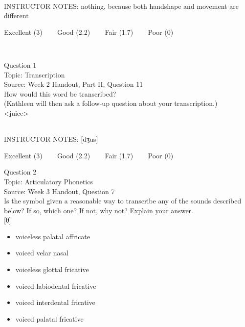 \documentclass[12pt]{article}
\begin{document}
~\\
INSTRUCTOR NOTES: nothing, because both handshape and movement are different


\vfill
Excellent (3) ~~~ Good (2.2) ~~~ Fair (1.7) ~~~ Poor (0)
\newpage

\begin{center}
\textbf{{\color{red}{\HUGE END OF EXAM}}}\\

\end{center}
\newpage

\begin{center}
\textbf{{\color{blue}{\HUGE START OF EXAM\\}}}

\textbf{{\color{blue}{\HUGE Student ID: 67535\\}}}

\textbf{{\color{blue}{\HUGE \\}}}

\end{center}
\newpage

{\large Question 1}\\

Topic: Transcription\\
Source: Week 2 Handout, Part II, Question 11\\

How would this word be transcribed?\\ (Kathleen will then ask a follow-up question about your transcription.)\\

<juice>


~\\
INSTRUCTOR NOTES: [dʒus]


\vfill
Excellent (3) ~~~ Good (2.2) ~~~ Fair (1.7) ~~~ Poor (0)
\newpage

{\large Question 2}\\

Topic: Articulatory Phonetics\\
Source: Week 3 Handout, Question 7\\

Is the symbol given a reasonable way to transcribe any of the sounds described below? If so, which one? If not, why not? Explain your answer.\\

{[θ]}

\begin{itemize} \item voiceless palatal affricate \item voiced velar nasal \item voiceless glottal fricative \item voiced labiodental fricative \item voiced interdental fricative \item voiced palatal fricative \end{itemize}
\end{document}
